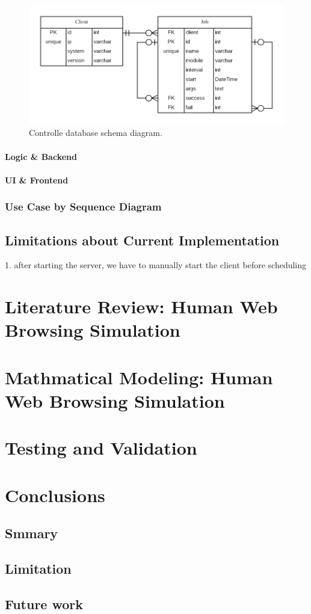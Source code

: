 \documentclass[12pt]{report}
\begin{document}
\begin{figure}[h!]
	\centering
	\includegraphics[width=1\textwidth]{./pictures/db-schema}
	\caption{Controlle database schema diagram.}
\end{figure}



\subsubsection{Logic \& Backend}

\subsubsection{UI \& Frontend}


\subsection{Use Case by Sequence Diagram}


\section{Limitations about Current Implementation}
1. after starting the server, we have to manually start the client before scheduling



\chapter{Literature Review: Human Web Browsing Simulation} \label{lr:hwbs}

\chapter{Mathmatical Modeling: Human Web Browsing Simulation} \label{mm}

\chapter{Testing and Validation} \label{tv}

\chapter{Conclusions}
\section{Smmary}
\section{Limitation}
\section{Future work}





\end{document}
